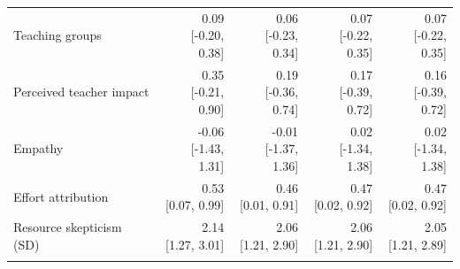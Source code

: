 \begin{tabular}{@{}p{3.6cm}rrrr@{}}
Teaching groups & \shortstack{0.09\\{[-0.20, 0.38]}} & \shortstack{0.06\\{[-0.23, 0.34]}} & \shortstack{0.07\\{[-0.22, 0.35]}} & \shortstack{0.07\\{[-0.22, 0.35]}} \\\addlinespace[2pt]
Perceived teacher impact & \shortstack{0.35\\{[-0.21, 0.90]}} & \shortstack{0.19\\{[-0.36, 0.74]}} & \shortstack{0.17\\{[-0.39, 0.72]}} & \shortstack{0.16\\{[-0.39, 0.72]}} \\\addlinespace[2pt]
Empathy & \shortstack{-0.06\\{[-1.43, 1.31]}} & \shortstack{-0.01\\{[-1.37, 1.36]}} & \shortstack{0.02\\{[-1.34, 1.38]}} & \shortstack{0.02\\{[-1.34, 1.38]}} \\\addlinespace[2pt]
Effort attribution & \shortstack{0.53\\{[0.07, 0.99]}} & \shortstack{0.46\\{[0.01, 0.91]}} & \shortstack{0.47\\{[0.02, 0.92]}} & \shortstack{0.47\\{[0.02, 0.92]}} \\\addlinespace[2pt]
Resource skepticism (SD) & \shortstack{2.14\\{[1.27, 3.01]}} & \shortstack{2.06\\{[1.21, 2.90]}} & \shortstack{2.06\\{[1.21, 2.90]}} & \shortstack{2.05\\{[1.21, 2.89]}} \\\addlinespace[2pt]
\bottomrule
\end{tabular}
